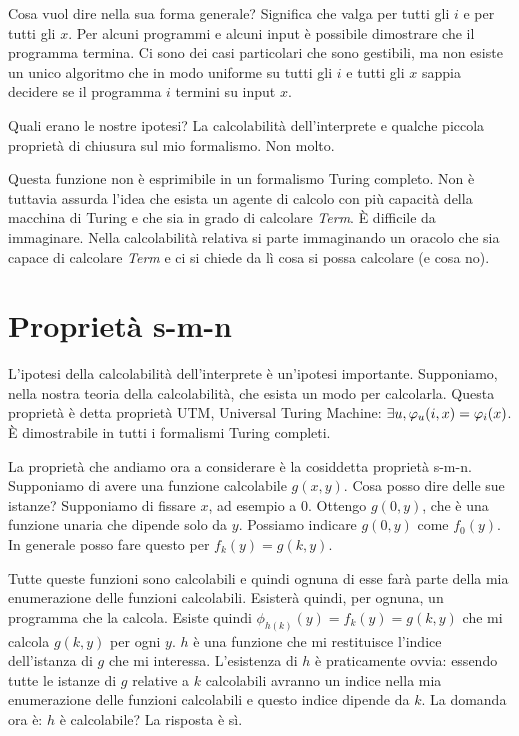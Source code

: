 Cosa vuol dire nella sua forma generale? Significa che valga per tutti gli $i$ e per tutti gli $x$.
Per alcuni programmi e alcuni input è possibile dimostrare che il programma termina. Ci sono dei
casi particolari che sono gestibili, ma non esiste un unico algoritmo che in modo uniforme su tutti
gli $i$ e tutti gli $x$ sappia decidere se il programma $i$ termini su input $x$.

Quali erano le nostre ipotesi? La calcolabilità dell'interprete e qualche piccola proprietà di
chiusura sul mio formalismo. Non molto.

Questa funzione non è esprimibile in un formalismo Turing completo. Non è tuttavia assurda l'idea
che esista un agente di calcolo con più capacità della macchina di Turing e che sia in grado di
calcolare \textit{Term}. È difficile da immaginare. Nella calcolabilità relativa si parte
immaginando un oracolo che sia capace di calcolare \textit{Term} e ci si chiede da lì cosa si possa
calcolare (e cosa no).

\section{Proprietà s-m-n}


L'ipotesi della calcolabilità dell'interprete è un'ipotesi importante. Supponiamo, nella nostra
teoria della calcolabilità, che esista un modo per calcolarla. Questa proprietà è detta proprietà
UTM, Universal Turing Machine: $\exists u, \varphi_{u}(i,x) = \varphi_{i}(x)$. È dimostrabile in tutti i
formalismi Turing completi.

La proprietà che andiamo ora a considerare è la cosiddetta proprietà s-m-n. Supponiamo di avere
una funzione calcolabile $g(x,y)$. Cosa posso dire delle sue istanze? Supponiamo di fissare $x$, ad
esempio a $0$. Ottengo $g(0,y)$, che è una funzione unaria che dipende solo da $y$. Possiamo indicare
$g(0,y)$ come $f_{0}(y)$. In generale posso fare questo per $f_{k}(y) = g(k,y)$.

Tutte queste funzioni sono calcolabili e quindi ognuna di esse farà parte della mia enumerazione
delle funzioni calcolabili. Esisterà quindi, per ognuna, un programma che la calcola. Esiste quindi
$\phi_{h(k)}(y) = f_{k}(y) = g(k,y)$ che mi calcola $g(k,y)$ per ogni $y$. $h$ è una funzione che
mi restituisce l'indice dell'istanza di $g$ che mi interessa. L'esistenza di $h$ è praticamente
ovvia: essendo tutte le istanze di $g$ relative a $k$ calcolabili avranno un indice nella mia
enumerazione delle funzioni calcolabili e questo indice dipende da $k$. La domanda ora è: $h$ è
calcolabile? La risposta è sì.

